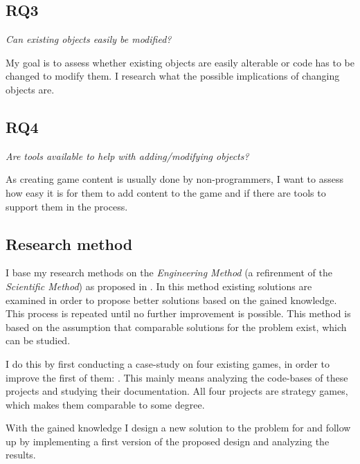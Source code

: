 \subsection{RQ3}
\textit{Can existing objects easily be modified?}

My goal is to assess whether existing objects are easily alterable or code has to be changed to modify them. I
research what the possible implications of changing objects are.

\subsection{RQ4}
\textit{Are tools available to help with adding/modifying objects?}

As creating game content is usually done by non-programmers, I want to assess how easy it is for them to add content to
the game and if there are tools to support them in the process.

\subsection{Research method}
I base my research methods on the \textit{Engineering Method} (a refirenment of the \textit{Scientific Method}) as
proposed in \cite{Basili:1992:EPS:647362.725507}. In this method existing solutions are examined in order to propose
better solutions based on the gained knowledge. This process is repeated until no further improvement is possible.
This method is based on the assumption that comparable solutions for the problem exist, which can be studied. 

I do this by first conducting a case-study on four existing \OS{} games,
in order to improve the first of them: \UH{}. This mainly means analyzing the code-bases of these projects and
studying their documentation. All four projects are \OS{} strategy games, which makes them comparable to some degree.

With the gained knowledge I design a new solution to the problem for \UH{} and follow up by implementing a first version
of the proposed design and analyzing the results.
